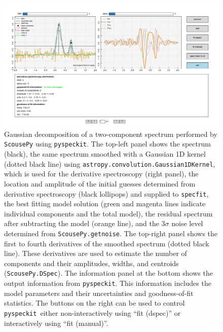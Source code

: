 \documentclass[twocolumn]{aastex63}
\newcommand{\pyspeckit}{\texttt{pyspeckit}\xspace}
\begin{document}
\begin{figure}[!htp]
\includegraphics[scale=1,width=7in]{scousepy.png}
\caption{Gaussian decomposition of a two-component spectrum performed by \texttt{ScousePy} using \pyspeckit. The top-left panel shows the spectrum (black), the same spectrum smoothed with a Gaussian 1D kernel (dotted black line) using \texttt{astropy.convolution.Gaussian1DKernel}, which is used for the derivative spectroscopy (right panel), the location and amplitude of the initial guesses determined from derivative spectroscopy (black lollipops) and supplied to \texttt{specfit}, the best fitting model solution (green and magenta lines indicate individual components and the total model), the residual spectrum after subtracting the model (orange line), and the $3\sigma$ noise level determined from \texttt{ScousePy.getnoise}. The top-right panel shows the first to fourth derivatives of the smoothed spectrum (dotted black line).
These derivatives are used to estimate the number of components and their amplitudes, widths, and centroids (\texttt{ScousePy.DSpec}). The information panel at the bottom shows the output information from \pyspeckit. This information includes the model parameters and their uncertainties and goodness-of-fit statistics. The buttons on the right can be used to control \pyspeckit \ either non-interactively using ``fit (dspec)'' or interactively using ``fit (manual)''. }
\label{fig:scousepydemo}
\end{figure}
\end{document}
